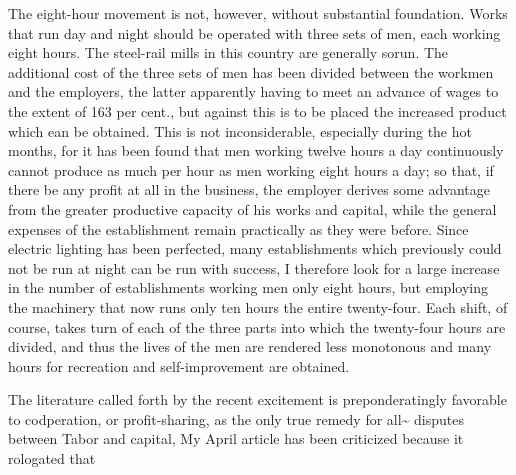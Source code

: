 \documentclass[11pt,openany]{book}
\begin{document}
The eight-hour movement is not, however, without substantial foundation. Works that run day and night should be operated with three sets of men, each working eight hours. The steel-rail mills in this country are generally sorun. The additional cost of the three sets of men has been divided between the workmen and the employers, the latter apparently having to meet an advance of wages to the extent of 163 per cent., but against this is to be placed the increased product which ean be obtained. This is not inconsiderable, especially during the hot months, for it has been found that men working twelve hours a day continuously cannot produce as much per hour as men working eight hours a day; so that, if there be any profit at all in the business, the employer derives some advantage from the greater productive capacity of his works and capital, while the general expenses of the establishment remain practically as they were before. Since electric lighting has been perfected, many establishments which previously could not be run at night can be run with success, I therefore look for a large increase in the number of establishments working men only eight hours, but employing the machinery that now runs only ten hours the entire twenty-four. Each shift, of course, takes turn of each of the three parts into which the twenty-four hours are divided, and thus the lives of the men are rendered less monotonous and many hours for recreation and self-improvement are obtained.

The literature called forth by the recent excitement is preponderatingly favorable to codperation, or profit-sharing, as the only true remedy for all\textasciitilde{} disputes between Tabor and capital, My April article has been criticized because it rologated that
\end{document}
